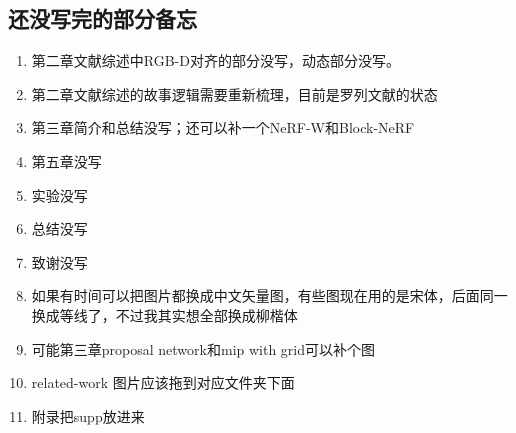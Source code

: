 %
%
%
%
%
%

\begin{appendices}
  \section{还没写完的部分备忘}
  \begin{enumerate}
      \item 第二章文献综述中RGB-D对齐的部分没写，动态部分没写。
      \item 第二章文献综述的故事逻辑需要重新梳理，目前是罗列文献的状态
      \item 第三章简介和总结没写；还可以补一个NeRF-W和Block-NeRF
      \item 第五章没写
      \item 实验没写
      \item 总结没写
      \item 致谢没写
      \item 如果有时间可以把图片都换成中文矢量图，有些图现在用的是宋体，后面同一换成等线了，不过我其实想全部换成柳楷体
      \item 可能第三章proposal network和mip with grid可以补个图
      \item related-work 图片应该拖到对应文件夹下面
      \item 附录把supp放进来
  \end{enumerate}

\end{appendices}

